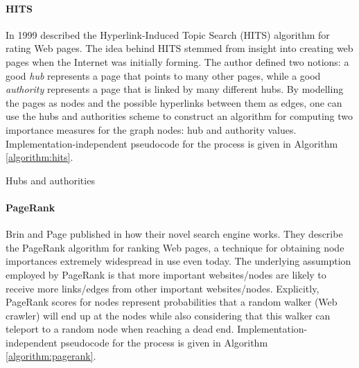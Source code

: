 \paragraph{HITS} In 1999 \cite{kleinberg_authoritative_1999} described the Hyperlink-Induced Topic Search (HITS) algorithm for rating Web pages. The idea behind HITS stemmed from insight into creating web pages when the Internet was initially forming. The author defined two notions: a good \emph{hub} represents a page that points to many other pages, while a good \emph{authority} represents a page that is linked by many different hubs. By modelling the pages as nodes and the possible hyperlinks between them as edges, one can use the hubs and authorities scheme to construct an algorithm for computing two importance measures for the graph nodes: hub and authority values. Implementation-independent pseudocode for the process is given in Algorithm \ref{algorithm:hits}.

\begin{algorithm}[H]
\caption{Hubs and authorities}
\label{algorithm:hits}
\begin{algorithmic}
\ENDWHILE
{}
\end{algorithmic}
\end{algorithm}

\paragraph{PageRank} Brin and Page published in \cite{brin_anatomy_1998} how their novel search engine works. They describe the PageRank algorithm for ranking Web pages, a technique for obtaining node importances extremely widespread in use even today. The underlying assumption employed by PageRank is that more important websites/nodes are likely to receive more links/edges from other important websites/nodes. Explicitly, PageRank scores for nodes represent probabilities that a random walker (Web crawler) will end up at the nodes while also considering that this walker can teleport to a random node when reaching a dead end. Implementation-independent pseudocode for the process is given in Algorithm \ref{algorithm:pagerank}.


